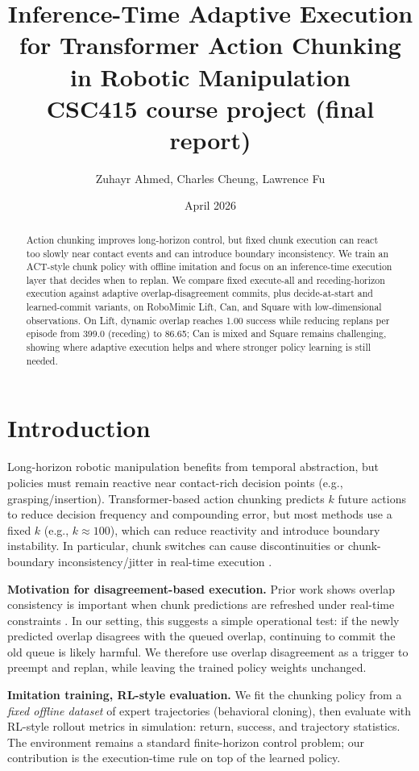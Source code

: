 \documentclass{article}
\title{Inference-Time Adaptive Execution for Transformer Action Chunking in Robotic Manipulation\\\vspace{0.35em}\large CSC415 course project (final report)}
\author{Zuhayr Ahmed, Charles Cheung, Lawrence Fu}
\date{April 2026}
\begin{document}
\maketitle

\begin{abstract}
Action chunking improves long-horizon control, but fixed chunk execution can react too slowly near contact events and can introduce boundary inconsistency. We train an ACT-style chunk policy with offline imitation and focus on an inference-time execution layer that decides when to replan. We compare fixed execute-all and receding-horizon execution against adaptive overlap-disagreement commits, plus decide-at-start and learned-commit variants, on RoboMimic Lift, Can, and Square with low-dimensional observations. On Lift, dynamic overlap reaches 1.00 success while reducing replans per episode from 399.0 (receding) to 86.65; Can is mixed and Square remains challenging, showing where adaptive execution helps and where stronger policy learning is still needed.
\end{abstract}

\section{Introduction}

Long-horizon robotic manipulation benefits from temporal abstraction, but policies must remain reactive near contact-rich decision points (e.g., grasping/insertion). Transformer-based action chunking predicts $k$ future actions to reduce decision frequency and compounding error, but most methods use a fixed $k$ (e.g., $k \approx 100$), which can reduce reactivity and introduce boundary instability. In particular, chunk switches can cause discontinuities or chunk-boundary inconsistency/jitter in real-time execution \cite{real_time_chunking,bidirect}.

\textbf{Motivation for disagreement-based execution.} Prior work shows overlap consistency is important when chunk predictions are refreshed under real-time constraints \cite{real_time_chunking}. In our setting, this suggests a simple operational test: if the newly predicted overlap disagrees with the queued overlap, continuing to commit the old queue is likely harmful. We therefore use overlap disagreement as a trigger to preempt and replan, while leaving the trained policy weights unchanged.

\textbf{Imitation training, RL-style evaluation.} We fit the chunking policy from a \emph{fixed offline dataset} of expert trajectories (behavioral cloning), then evaluate with RL-style rollout metrics in simulation: return, success, and trajectory statistics. The environment remains a standard finite-horizon control problem; our contribution is the execution-time rule on top of the learned policy.
\end{document}
